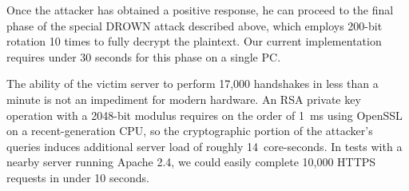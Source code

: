 Once the attacker has obtained a positive response, he
can proceed to the final phase of the special DROWN attack described above, 
which employs 200-bit rotation 10 times to fully decrypt the
plaintext.   Our current implementation requires under
30 seconds for this phase on a single PC.

%


The ability of the victim server to perform 17,000 handshakes in less than a
minute is not an impediment for modern hardware.  An RSA
private key operation with a 2048-bit modulus requires on the order of
1~ms using OpenSSL on a recent-generation CPU, so the cryptographic
portion of the attacker's queries induces additional server load of
roughly 14~core-seconds.  In tests with a nearby server running Apache
2.4, we could easily complete 10,000 HTTPS requests in under 10
seconds.





